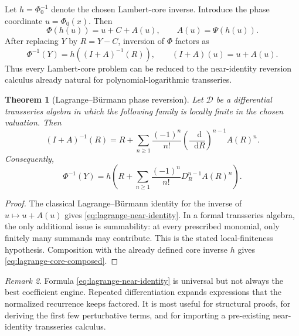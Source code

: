 \documentclass[11pt,oneside]{article}
\theoremstyle{plain}
\newtheorem{theorem}{Theorem}[section]
\theoremstyle{definition}
\theoremstyle{remark}
\newtheorem{remark}[theorem]{Remark}
\newcommand{\dd}{\mathop{}\!\mathrm{d}}
\begin{document}
Let \(h=\Phi_0^{-1}\) denote the chosen Lambert-core inverse.  Introduce the
phase coordinate \(u=\Phi_0(x)\).  Then
\begin{equation}
 \Phi(h(u))=u+C+A(u),
 \qquad A(u)=\Psi(h(u)).
 \label{eq:phase-coordinate-map}
\end{equation}
After replacing \(Y\) by \(R=Y-C\), inversion of \(\Phi\) factors as
\begin{equation}
 \Phi^{-1}(Y)=h\!\left((I+A)^{-1}(R)\right),
 \qquad (I+A)(u)=u+A(u).
 \label{eq:inverse-factorization}
\end{equation}
Thus every Lambert-core problem can be reduced to the near-identity reversion
calculus already natural for polynomial-logarithmic transseries.

\begin{theorem}[Lagrange--B\"urmann phase reversion]
\label{thm:lagrange-phase}
Let \(\mathscr D\) be a differential transseries algebra in which the following
family is locally finite in the chosen valuation.  Then
\begin{equation}
 (I+A)^{-1}(R)
 =R+\sum_{n\ge1}\frac{(-1)^n}{n!}
 \left(\frac{\dd}{\dd R}\right)^{n-1}A(R)^n.
 \label{eq:lagrange-near-identity}
\end{equation}
Consequently,
\begin{equation}
 \Phi^{-1}(Y)
 =h\!\left(
 R+\sum_{n\ge1}\frac{(-1)^n}{n!}
 D_R^{n-1}A(R)^n
 \right).
 \label{eq:lagrange-core-composed}
\end{equation}
\end{theorem}

\begin{proof}
The classical Lagrange--B\"urmann identity for the inverse of
\(u\mapsto u+A(u)\) gives \cref{eq:lagrange-near-identity}.  In a formal
transseries algebra, the only additional issue is summability: at every
prescribed monomial, only finitely many summands may contribute.  This is the
stated local-finiteness hypothesis.  Composition with the already defined
core inverse \(h\) gives \cref{eq:lagrange-core-composed}.
\end{proof}

\begin{remark}
Formula \cref{eq:lagrange-near-identity} is universal but not always the best
coefficient engine.  Repeated differentiation expands expressions that the
normalized recurrence keeps factored.  It is most useful for structural
proofs, for deriving the first few perturbative terms, and for importing a
pre-existing near-identity transseries calculus.
\end{remark}
\end{document}
